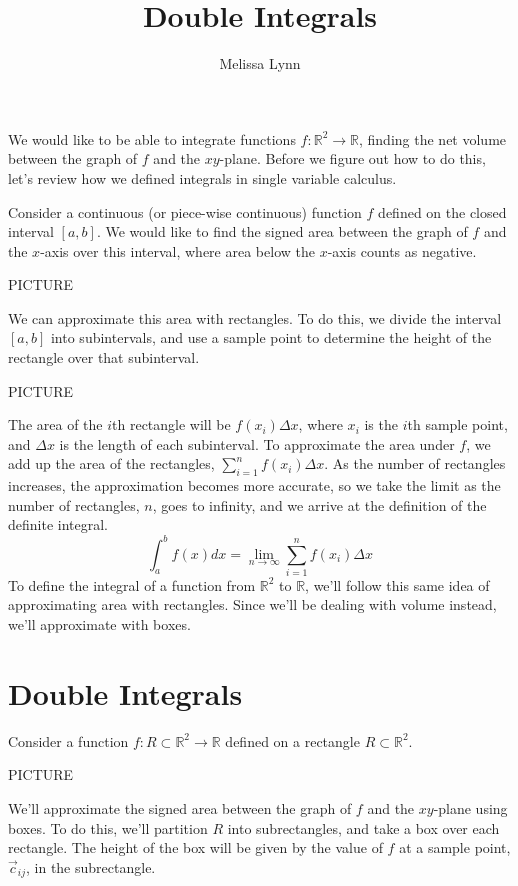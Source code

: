 \documentclass{ximera}
\title{Double Integrals}
\author{Melissa Lynn}
\begin{document}
  
\begin{abstract}  
\end{abstract}  
\maketitle  

We would like to be able to integrate functions $f:\mathbb{R}^2\rightarrow\mathbb{R}$, finding the net volume between the graph of $f$ and the $xy$-plane. Before we figure out how to do this, let's review how we defined integrals in single variable calculus.

Consider a continuous (or piece-wise continuous) function $f$ defined on the closed interval $[a,b]$. We would like to find the signed area between the graph of $f$ and the $x$-axis over this interval, where area below the $x$-axis counts as negative.

PICTURE

We can approximate this area with rectangles. To do this, we divide the interval $[a,b]$ into subintervals, and use a sample point to determine the height of the rectangle over that subinterval.

PICTURE

The area of the $i$th rectangle will be $f(x_i)\Delta x$, where $x_i$ is the $i$th sample point, and $\Delta x$ is the length of each subinterval. To approximate the area under $f$, we add up the area of the rectangles, $\sum_{i=1}^n f(x_i)\Delta x$. As the number of rectangles increases, the approximation becomes more accurate, so we take the limit as the number of rectangles, $n$, goes to infinity, and we arrive at the definition of the definite integral.
\[
\int_a^b f(x)dx = \lim_{n\rightarrow \infty} \sum_{i=1}^n f(x_i)\Delta x
\]
To define the integral of a function from $\mathbb{R}^2$ to $\mathbb{R}$, we'll follow this same idea of approximating area with rectangles. Since we'll be dealing with volume instead, we'll approximate with boxes.

\section*{Double Integrals}

Consider a function $f:R\subset\mathbb{R}^2\rightarrow\mathbb{R}$ defined on a rectangle $R\subset\mathbb{R}^2$.

PICTURE

We'll approximate the signed area between the graph of $f$ and the $xy$-plane using boxes. To do this, we'll partition $R$ into subrectangles, and take a box over each rectangle. The height of the box will be given by the value of $f$ at a sample point, $\vec{c}_{ij}$, in the subrectangle.
\end{document}
